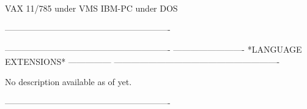       VAX 11/785 under VMS
      IBM-PC     under DOS
 
----------------------------------------------------------
 
 
 
 
 
 
 
 
 
 
 
 
 
 
 
 
 
 
 
 
 
 
 
 
 
 
 
 
 
 
 
 
 
 
 
 
 
 
 
 
 
 
 
 
 
 
 
 
 
 
 
 
 
 
 
 
 
 
 
 
 
 
 
 
 
 
 
 
 
 
 
 
 
 
 
 
 
 
 
 
 
 
 
 
 
 
 
 
 
----------------------------------------------------------
-------------------------  *LANGUAGE EXTENSIONS*  ---------------
----------------------------------------------------------
 
No description available as of yet.
 
----------------------------------------------------------
 
 
 
 
 
